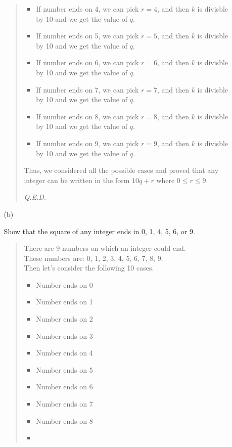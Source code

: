 \documentclass[12pt, a4paper]{article}                      %
\begin{document}
\begin{itemize}
\begin{itemize}
\begin{quote}
\begin{itemize}
\item
If number ends on 4, we can pick $r = 4$, and then $k$ is divisble by 10 and we get the value of $q$.\\
\item
If number ends on 5, we can pick $r = 5$, and then $k$ is divisble by 10 and we get the value of $q$.\\
\item
If number ends on 6, we can pick $r = 6$, and then $k$ is divisble by 10 and we get the value of $q$.\\
\item
If number ends on 7, we can pick $r = 7$, and then $k$ is divisble by 10 and we get the value of $q$.\\
\item
If number ends on 8, we can pick $r = 8$, and then $k$ is divisble by 10 and we get the value of $q$.\\
\item
If number ends on 9, we can pick $r = 9$, and then $k$ is divisble by 10 and we get the value of $q$.\\
\end{itemize}
Thus, we considered all the possible cases and proved that any integer can be written in the form $10q + r$ where $0 \leq r \leq 9$.
\begin{flushright}
\textit{Q.E.D.}
\end{flushright}
\end{quote}
\item[(b)]
\item[]
Show that the square of any integer ends in 0, 1, 4, 5, 6, or 9.
\begin{quote}
There are 9 numbers on which an integer could end.\\
These numbers are: 0, 1, 2, 3, 4, 5, 6, 7, 8, 9.\\
Then let's consider the following 10 cases.
\begin{itemize}
\item
Number ends on 0
\item
Number ends on 1
\item
Number ends on 2
\item
Number ends on 3
\item
Number ends on 4
\item
Number ends on 5
\item
Number ends on 6
\item
Number ends on 7
\item
Number ends on 8
\item

\end{itemize}
\end{quote}
\end{itemize}
\end{itemize}
\end{document}

